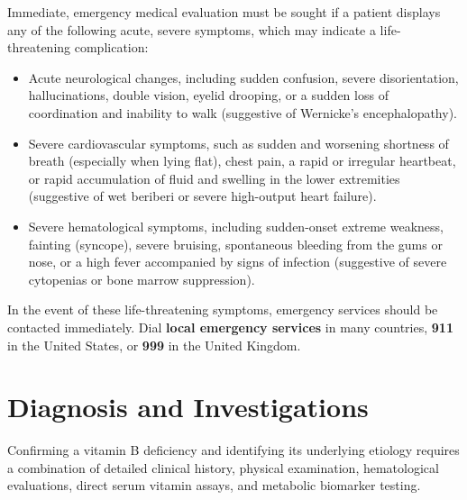 Immediate, emergency medical evaluation must be sought if a patient displays any of the following acute, severe symptoms, which may indicate a life-threatening complication:
\begin{itemize}
    \item Acute neurological changes, including sudden confusion, severe disorientation, hallucinations, double vision, eyelid drooping, or a sudden loss of coordination and inability to walk (suggestive of Wernicke's encephalopathy).
    \item Severe cardiovascular symptoms, such as sudden and worsening shortness of breath (especially when lying flat), chest pain, a rapid or irregular heartbeat, or rapid accumulation of fluid and swelling in the lower extremities (suggestive of wet beriberi or severe high-output heart failure).
    \item Severe hematological symptoms, including sudden-onset extreme weakness, fainting (syncope), severe bruising, spontaneous bleeding from the gums or nose, or a high fever accompanied by signs of infection (suggestive of severe cytopenias or bone marrow suppression).
\end{itemize}
In the event of these life-threatening symptoms, emergency services should be contacted immediately. Dial \textbf{local emergency services} in many countries, \textbf{911} in the United States, or \textbf{999} in the United Kingdom.

\section*{Diagnosis and Investigations}
Confirming a vitamin B deficiency and identifying its underlying etiology requires a combination of detailed clinical history, physical examination, hematological evaluations, direct serum vitamin assays, and metabolic biomarker testing.

